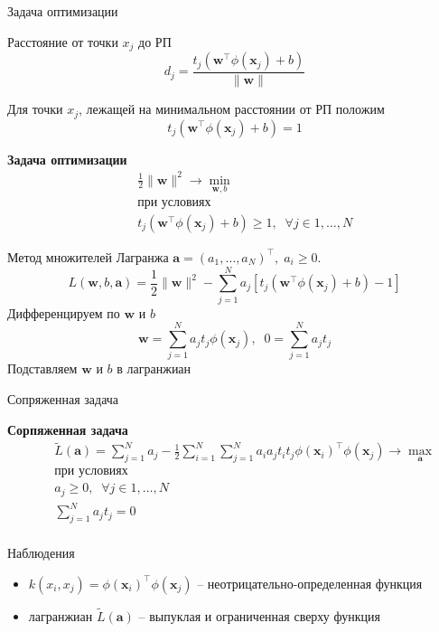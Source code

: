 \documentclass[aspectratio=169]{beamer}
\begin{document}
\begin{frame}{Задача оптимизации}

Расстояние от точки $x_j$ до РП
\[
d_j = \frac{t_j (\mathbf{w}^\top \phi(\mathbf{x}_j) + b)}{\|\mathbf{w}\|}
\]

Для точки $x_j$, лежащей на минимальном расстоянии от РП положим
\[
t_j (\mathbf{w}^\top \phi(\mathbf{x}_j) + b) = 1
\]

\begin{framed}
{\bf Задача оптимизации}
\begin{eqnarray*}
&& \frac 1 2 \|\mathbf{w}\|^2 \rightarrow \min_{\mathbf{w}, b} \\
&& \text{при условиях} \\
&& t_j (\mathbf{w}^\top \phi(\mathbf{x}_j) + b) \geq 1, \;\; \forall j \in 1,\ldots,N
\end{eqnarray*}
\end{framed}

\end{frame}

\begin{frame}{}

Метод множителей Лагранжа $\mathbf{a} = (a_1, \ldots, a_N)^\top,\;a_i \geq 0$.
\[
L(\mathbf{w}, b, \mathbf{a}) = \frac 1 2 \|\mathbf{w}\|^2 - \sum_{j=1}^N a_j [t_j (\mathbf{w}^\top \phi(\mathbf{x}_j) + b) - 1]
\]
Дифференцируем по $\mathbf{w}$ и $b$
\[
\mathbf{w} = \sum_{j=1}^N a_j t_j \phi(\mathbf{x}_j), \;\; 0 = \sum_{j=1}^N a_j t_j
\]
Подставляем $\mathbf{w}$ и $b$ в лагранжиан

\end{frame}

\begin{frame}{Сопряженная задача}

\begin{framed}
{\bf Сорпяженная задача}
\begin{eqnarray*}
&& \tilde{L}(\mathbf{a}) = \sum_{j=1}^N a_j - \frac{1}{2} \sum_{i=1}^N \sum_{j=1}^N a_i a_j t_i t_j \phi(\mathbf{x}_i)^\top \phi(\mathbf{x}_j) \rightarrow \max_{\mathbf{a}} \\
&& \text{при условиях} \\
&& a_j \geq 0, \;\; \forall j \in 1,\ldots,N \\
&& \sum_{j=1}^N a_j t_j = 0\\
\end{eqnarray*}
\end{framed}

Наблюдения
\begin{itemize}
\item $k(x_i, x_j) = \phi(\mathbf{x}_i)^\top \phi(\mathbf{x}_j)$ -- неотрицательно-определенная функция
\item лагранжиан $\tilde L(\mathbf{a})$ -- выпуклая и ограниченная сверху функция
\end{itemize}

\end{frame}
\end{document}
